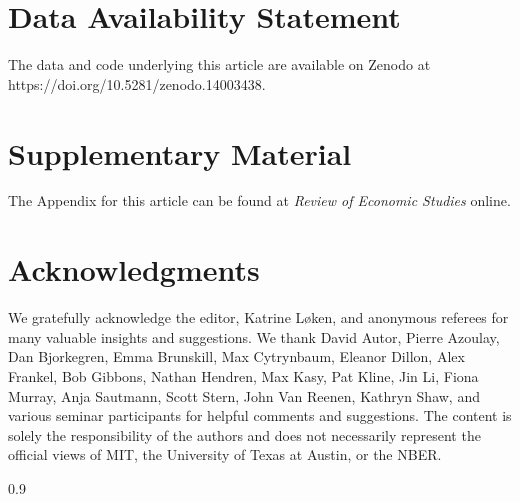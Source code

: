 \documentclass[crop,noquery,editorname,historyrev,nosurname,runningno,sepcount]{RESTUD}
\begin{document}
\section*{Data Availability Statement}
The data and code underlying this article are available on Zenodo at https://doi.org/10.5281/zenodo.14003438.

\section*{Supplementary Material}
The Appendix for this article can be found at \textit{Review of Economic Studies} online.
 
\section*{Acknowledgments}
We gratefully acknowledge the editor, Katrine Løken, and anonymous referees for many valuable insights and suggestions. We thank David Autor, Pierre Azoulay, Dan Bjorkegren, Emma Brunskill, Max Cytrynbaum, Eleanor Dillon, Alex Frankel, Bob Gibbons, Nathan Hendren, Max Kasy, Pat Kline, Jin Li, Fiona Murray, Anja Sautmann, Scott Stern, John Van Reenen, Kathryn Shaw, and various seminar participants for helpful comments and suggestions. The content is solely the responsibility of the authors and does not necessarily represent the official views of MIT, the University of Texas at Austin, or the NBER.

\clearpage
\begin{spacing}{0.9}


\end{spacing}
\end{document}
